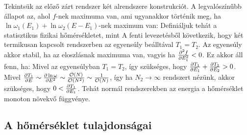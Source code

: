    Tekintsük az előző zárt rendszer két alrendszere konstrukciót. A legvalószínűbb állapot az, ahol $f$-nek maximuma van, ami ugyanakkor történik meg, ha $\ln\omega_1(E_1)+\ln\omega_2(E-E_1)$-nek maximum van:
   Definiáljuk tehát a statisztikus fizikai hőmérsékletet, mint
   A fenti levezetésből következik, hogy két termikusan kapcsolt rendszerben az egyensúly beálltával $T_1=T_2$. Az egyensúly akkor stabil, ha az eloszlásnak maximuma van, vagyis ha $\frac{\partial ^2f}{\partial E_1^2}<0$. Ez akkor áll fenn, ha:
   Mivel az egyensúlyban $T_1=T_2$, így szükséges, hogy $\frac{\partial T_1}{\partial E_1}+\frac{\partial T_2}{\partial E_2}>0$. Mivel $\frac{\partial T_1}{\partial E}\sim\frac{\partial \ln\omega}{\partial E^2}\sim\frac{\mathcal{O}(N)}{\mathcal{O}(N^2)}\sim\frac{1}{\mathcal{O}(N)}$, így ha $N_2\to\infty$ rendszert nézünk, akkor szükséges, hogy $0<\frac{\partial T_1}{\partial E_1}$. Tehát normál rendszerekben az energia a hőmérséklet monoton növekvő függvénye.
   
  \subsection{A hőmérséklet tulajdonságai}
   
